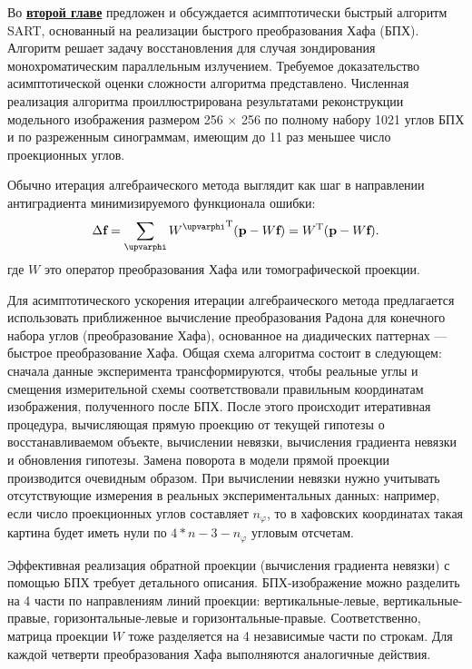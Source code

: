 Во \underline{\textbf{второй главе}} предложен и обсуждается асимптотически быстрый алгоритм SART, основанный на реализации быстрого преобразования Хафа (БПХ).
Алгоритм решает задачу восстановления для случая зондирования монохроматическим параллельным излучением.
Требуемое доказательство асимптотической оценки сложности алгоритма представлено.
Численная реализация алгоритма проиллюстрирована результатами реконструкции модельного изображения размером 256 $\times$ 256 по полному набору 1021 углов БПХ и по разреженным синограммам, имеющим до 11 раз меньшее число проекционных углов.

Обычно итерация алгебраического метода выглядит как шаг в направлении антиградиента минимизируемого функционала ошибки:
\begin{equation}\notag
  \Delta \textbf f = \sum_\varphi {{W^\varphi}^{\mathrm T}(\textbf p - W\textbf f) } = W^{\mathrm T}(\textbf p - W \textbf f).
\end{equation}
где $W$ это оператор преобразования Хафа или томографической проекции.
  
Для асимптотического ускорения итерации алгебраического метода предлагается использовать приближенное вычисление преобразования Радона для конечного набора углов (преобразование Хафа), основанное на диадических паттернах --- быстрое преобразование Хафа.
Общая схема алгоритма состоит в следующем: сначала данные эксперимента трансформируются, чтобы реальные углы и смещения измерительной схемы соответствовали правильным координатам изображения, полученного после БПХ.
После этого происходит итеративная процедура, вычисляющая прямую проекцию от текущей гипотезы о восстанавливаемом объекте, вычислении невязки, вычисления градиента невязки и обновления гипотезы.
Замена поворота в модели прямой проекции производится очевидным образом.
При вычислении невязки нужно учитывать отсутствующие измерения в реальных экспериментальных данных: например, если число проекционных углов составляет $n_\varphi$, то в хафовских координатах такая картина будет иметь нули по $4 * n - 3 - n_\varphi$ угловым отсчетам.

Эффективная реализация обратной проекции (вычисления градиента невязки) с помощью БПХ требует детального описания.
БПХ-изображение можно разделить на 4 части по направлениям линий проекции: вертикальные-левые, вертикальные-правые, горизонтальные-левые и горизонтальные-правые.
Соответственно, матрица проекции $W$ тоже разделяется на 4 независимые части по строкам.
Для каждой четверти преобразования Хафа выполняются аналогичные действия.

